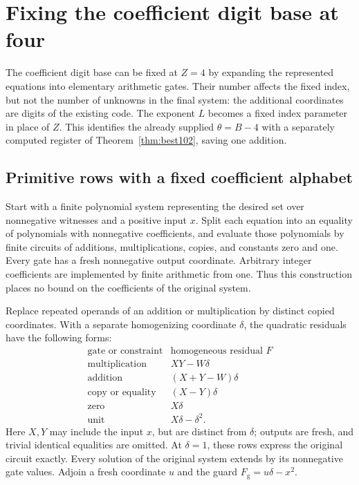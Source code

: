 \section{Fixing the coefficient digit base at four}\label{sec:fixed-four}

The coefficient digit base can be fixed at $Z=4$ by expanding the
represented equations into elementary arithmetic gates. Their number
affects the fixed index, but not the number of unknowns in the final
system: the additional coordinates are digits of the existing code.
The exponent $L$ becomes a fixed index parameter in place of $Z$.
This identifies the already supplied $\theta=B-4$ with a separately
computed register of Theorem~\ref{thm:best102}, saving one addition.

\subsection{Primitive rows with a fixed coefficient alphabet}

Start with a finite polynomial system representing the desired set
over nonnegative witnesses and a positive input $x$. Split each equation
into an equality of polynomials with nonnegative coefficients, and
evaluate those polynomials by finite circuits of additions,
multiplications, copies, and constants zero and one. Every gate has a
fresh nonnegative output coordinate. Arbitrary integer coefficients are
implemented by finite arithmetic from one. Thus this construction
places no bound on the coefficients of the original system.

Replace repeated operands of an addition or multiplication by distinct
copied coordinates. With a separate homogenizing coordinate $\delta$,
the quadratic residuals have the following forms:
\[
\begin{array}{c|l}
\text{gate or constraint}&\text{homogeneous residual }F\\ \hline
\text{multiplication}&XY-W\delta\\
\text{addition}&(X+Y-W)\delta\\
\text{copy or equality}&(X-Y)\delta\\
\text{zero}&X\delta\\
\text{unit}&X\delta-\delta^2.
\end{array}
\]
Here $X,Y$ may include the input $x$, but are distinct from $\delta$;
outputs are fresh, and trivial identical equalities are omitted.
At $\delta=1$, these rows express the original circuit exactly.
Every solution of the original system extends by its nonnegative gate
values. Adjoin a fresh coordinate $u$ and the guard
$F_{\mathrm g}=u\delta-x^2$.

